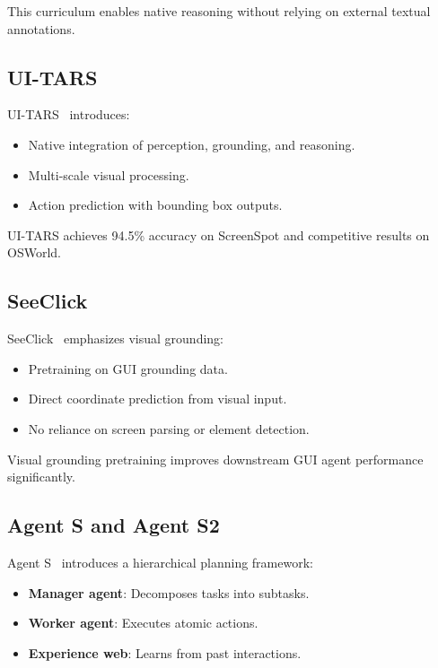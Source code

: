 \documentclass[11pt]{article}
\begin{document}
This curriculum enables native reasoning without relying on external textual annotations.

\subsection{UI-TARS}

UI-TARS~\cite{uitars2024} introduces:

\begin{itemize}
    \item Native integration of perception, grounding, and reasoning.
    \item Multi-scale visual processing.
    \item Action prediction with bounding box outputs.
\end{itemize}

UI-TARS achieves 94.5\% accuracy on ScreenSpot and competitive results on OSWorld.

\subsection{SeeClick}

SeeClick~\cite{seeclick2024} emphasizes visual grounding:

\begin{itemize}
    \item Pretraining on GUI grounding data.
    \item Direct coordinate prediction from visual input.
    \item No reliance on screen parsing or element detection.
\end{itemize}

Visual grounding pretraining improves downstream GUI agent performance significantly.

\subsection{Agent S and Agent S2}

Agent S~\cite{agents2024} introduces a hierarchical planning framework:

\begin{itemize}
    \item \textbf{Manager agent}: Decomposes tasks into subtasks.
    \item \textbf{Worker agent}: Executes atomic actions.
    \item \textbf{Experience web}: Learns from past interactions.
\end{itemize}
\end{document}

